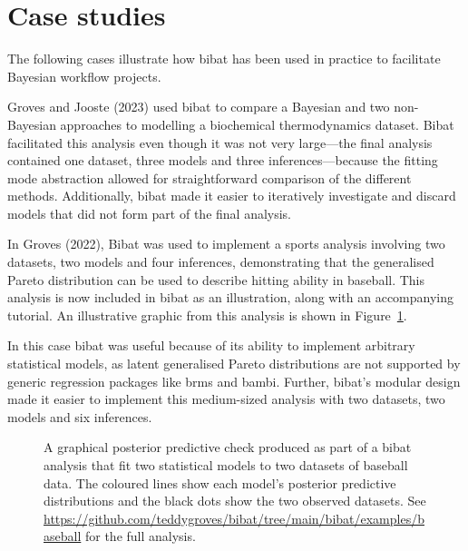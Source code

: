 \documentclass[
  letterpaper,
  DIV=11,
  numbers=noendperiod]{scrartcl}
\begin{document}
\section{Case studies}\label{case-studies}

The following cases illustrate how bibat has been used in practice to
facilitate Bayesian workflow projects.

Groves and Jooste (2023) used bibat to compare a Bayesian and two
non-Bayesian approaches to modelling a biochemical thermodynamics
dataset. Bibat facilitated this analysis even though it was not very
large---the final analysis contained one dataset, three models and three
inferences---because the fitting mode abstraction allowed for
straightforward comparison of the different methods. Additionally, bibat
made it easier to iteratively investigate and discard models that did
not form part of the final analysis.

In Groves (2022), Bibat was used to implement a sports analysis
involving two datasets, two models and four inferences, demonstrating
that the generalised Pareto distribution can be used to describe hitting
ability in baseball. This analysis is now included in bibat as an
illustration, along with an accompanying tutorial. An illustrative
graphic from this analysis is shown in Figure~\ref{fig-baseball}.

In this case bibat was useful because of its ability to implement
arbitrary statistical models, as latent generalised Pareto distributions
are not supported by generic regression packages like brms and bambi.
Further, bibat's modular design made it easier to implement this
medium-sized analysis with two datasets, two models and six inferences.

\begin{figure}


\caption{\label{fig-baseball}A graphical posterior predictive check
produced as part of a bibat analysis that fit two statistical models to
two datasets of baseball data. The coloured lines show each model's
posterior predictive distributions and the black dots show the two
observed datasets. See
\url{https://github.com/teddygroves/bibat/tree/main/bibat/examples/baseball}
for the full analysis.}

\end{figure}%
\end{document}
